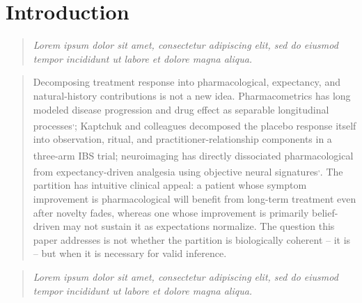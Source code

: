 \documentclass[
  11pt,
]{article}
\newenvironment{rgt}{%
  \begin{quote}\small\itshape\color[RGB]{20,60,160}}{%
  \end{quote}}
\newenvironment{orig}{%
  \begin{quote}\normalsize\color[gray]{0.55}}{%
  \end{quote}}
\begin{document}
\section{Introduction}\label{introduction}

\begin{rgt}
Lorem ipsum dolor sit amet, consectetur adipiscing elit, sed do eiusmod tempor incididunt ut labore et dolore magna aliqua.

\end{rgt}

\begin{orig}
Decomposing treatment response into pharmacological, expectancy,
and natural-history contributions is not a new idea.
Pharmacometrics has long modeled disease progression and drug
effect as separable longitudinal processes\textsuperscript{,}; Kaptchuk and colleagues decomposed the placebo
response itself into observation, ritual, and
practitioner-relationship components in a three-arm IBS trial\textsuperscript{}; neuroimaging has directly dissociated
pharmacological from expectancy-driven analgesia using objective
neural signatures\textsuperscript{,}. The
partition has intuitive clinical appeal: a patient whose symptom
improvement is pharmacological will benefit from long-term
treatment even after novelty fades, whereas one whose improvement
is primarily belief-driven may not sustain it as expectations
normalize. The question this paper addresses is not whether the
partition is biologically coherent -- it is -- but when it is
necessary for valid inference.

\end{orig}

\begin{rgt}
Lorem ipsum dolor sit amet, consectetur adipiscing elit, sed do eiusmod tempor incididunt ut labore et dolore magna aliqua.

\end{rgt}
\end{document}
